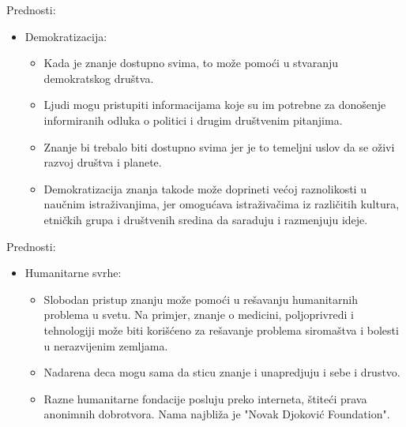 \documentclass[aspectratio=1610,17pt,utf8]{beamer}
\begin{document}
	\begin{frame}{Prednosti:}
		
		\begin{itemize}
			\item Demokratizacija:
			\begin{itemize}
				\item Kada je znanje dostupno svima, to može pomoći u stvaranju demokratskog društva.
				\item Ljudi mogu pristupiti informacijama koje su im potrebne za donošenje informiranih odluka o politici i drugim društvenim pitanjima.
				\item Znanje bi trebalo biti dostupno svima jer je to temeljni uslov da se oživi razvoj društva i planete.
                    \item Demokratizacija znanja takode može doprineti većoj raznolikosti u naučnim istraživanjima, jer omogućava istraživačima iz različitih kultura, etničkih grupa i društvenih sredina da saraduju i razmenjuju ideje.
				
			\end{itemize}
		\end{itemize}
	\end{frame}
	
	
	\begin{frame}{Prednosti:}
		
		\begin{itemize}
			\item Humanitarne svrhe:
			\begin{itemize}
				\item Slobodan pristup znanju može pomoći u rešavanju humanitarnih problema u svetu. Na primjer, znanje o medicini, poljoprivredi i tehnologiji može biti korišćeno za rešavanje problema siromaštva i bolesti u nerazvijenim zemljama.
				\item Nadarena deca mogu sama da sticu znanje i unapredjuju i sebe i drustvo.
                    \item Razne humanitarne fondacije posluju preko interneta, štiteći prava anonimnih dobrotvora. Nama najbliža je "Novak Djoković Foundation".				
				
			\end{itemize}
		\end{itemize}
	\end{frame}
\end{document}
